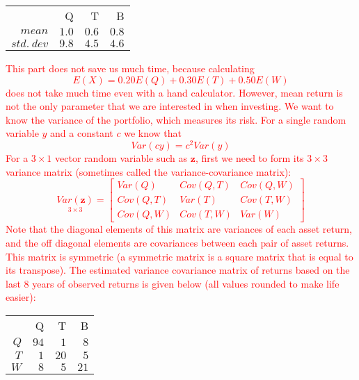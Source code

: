 \documentclass[12pt]{report}
\begin{document}
\begin{table}[!htbp]
	\centering
	\begin{tabular}{lrrr}
		\multicolumn{1}{r}{}&\multicolumn{1}{r}{Q}&\multicolumn{1}{r}{T}&\multicolumn{1}{r}{B}\\
		\multicolumn{1}{r}{$mean$}&\multicolumn{1}{r}{$1.0$}&\multicolumn{1}{r}{$0.6$}&\multicolumn{1}{r}{$0.8$}\\
		\multicolumn{1}{r}{$std.\ dev$}&\multicolumn{1}{r}{$9.8$}&\multicolumn{1}{r}{$4.5$}&\multicolumn{1}{r}{$4.6$}\\
	\end{tabular}
\end{table}
\noindent \textcolor{red}{This part does not save us much time, because calculating $$E(X) = 0.20E(Q) + 0.30E(T) + 0.50E(W)$$ does not take much time even with a hand calculator. However, mean return is not the only parameter that we are interested in when investing. We want to know the variance of the portfolio, which measures its risk. For a single random variable $y$ and a constant $c$ we know that $$Var(cy) = c^2Var(y)$$ For a $3\times 1$ vector random variable such as $\textbf{z}$, first we need to form its $3\times 3$ variance matrix (sometimes called the variance-covariance matrix):$$\underset{3\times3}{Var(\textbf{z})}
=
\begin{bmatrix}
Var(Q) & Cov(Q,T) & Cov(Q,W) \\
Cov(Q,T) & Var(T) & Cov(T,W) \\
Cov(Q,W) & Cov(T,W) & Var(W)
\end{bmatrix}$$ Note that the diagonal elements of this matrix are variances of each asset return, and the off diagonal elements are covariances between each pair of asset returns. This matrix is symmetric (a symmetric matrix is a square matrix that is equal to its transpose). The estimated variance covariance matrix of returns based on the last 8 years of observed returns is given below (all values rounded to make life easier):} 

\begin{table}[!htbp]
	\centering
	\begin{tabular}{lrrr}
		\multicolumn{1}{r}{}&\multicolumn{1}{r}{Q}&\multicolumn{1}{r}{T}&\multicolumn{1}{r}{B}\\
		\multicolumn{1}{r}{$Q$}&\multicolumn{1}{r}{$94$}&\multicolumn{1}{r}{$1$}&\multicolumn{1}{r}{$8$}\\
		\multicolumn{1}{r}{$T$}&\multicolumn{1}{r}{$1$}&\multicolumn{1}{r}{$20$}&\multicolumn{1}{r}{$5$}\\
		\multicolumn{1}{r}{$W$}&\multicolumn{1}{r}{$8$}&\multicolumn{1}{r}{$5$}&\multicolumn{1}{r}{$21$}\\
	\end{tabular}
\end{table}
\end{document}
